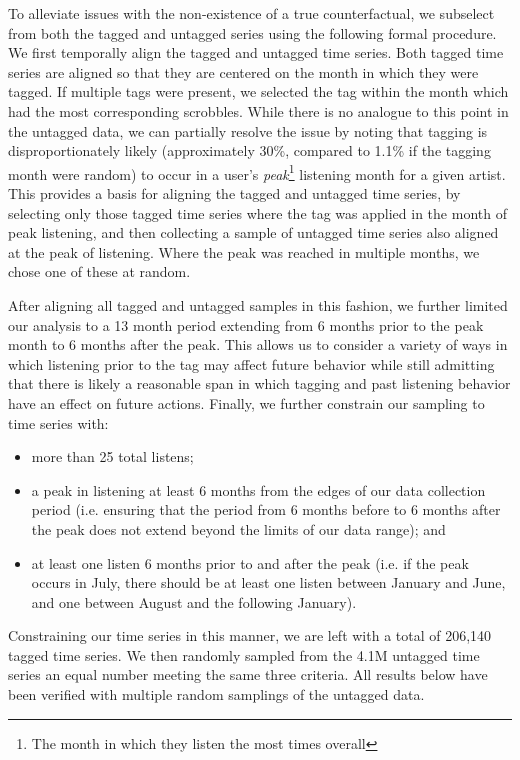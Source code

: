 To alleviate issues with the non-existence of a true counterfactual, we subselect from both the tagged and untagged series using the following formal procedure. We first temporally align the tagged and untagged time series. Both tagged time series are aligned so that they are centered on the month in which they were tagged.  If multiple tags were present, we selected the tag within the month which had the most corresponding scrobbles. While there is no analogue to this point in the untagged data, we can partially resolve the issue by noting that tagging is disproportionately likely (approximately 30\%, compared to 1.1\% if the tagging month were random) to occur in a user's \emph{peak}\footnote{The month in which they listen the most times overall} listening month for a given artist. This provides a basis for aligning the tagged and untagged time series, by selecting only those tagged time series where the tag was applied in the month of peak listening, and then collecting a sample of untagged time series also aligned at the peak of listening.  Where the peak was reached in multiple months, we chose one of these at random.

After aligning all tagged and untagged samples in this fashion, we further limited our analysis to a 13 month period extending from 6 months prior to the peak month to 6 months after the peak. This allows us to consider a variety of ways in which listening prior to the tag may affect future behavior while still admitting that there is likely a reasonable span in which tagging and past listening behavior have an effect on future actions. Finally, we further constrain our sampling to time series with:
\begin{itemize}
\item more than 25 total listens; 
\item a peak in listening at least 6 months from the edges of our data collection period (i.e. ensuring that the period from 6 months before to 6 months after the peak does not extend beyond the limits of our data range); and
\item at least one listen 6 months prior to and after the peak (i.e. if the peak occurs in July, there should be at least one listen between January and June, and one between August and the following January).
\end{itemize}

Constraining our time series in this manner, we are left with a total of 206,140 tagged time series.  We then randomly sampled from the 4.1M untagged time series an equal number meeting the same three criteria.  All results below have been verified with multiple random samplings of the untagged data.

